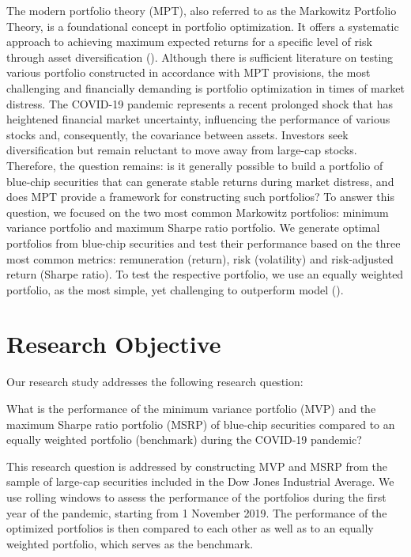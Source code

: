 \documentclass[a4paper,12pt]{article}
\begin{document}
The modern portfolio theory (MPT), also referred to as the Markowitz Portfolio Theory, is a foundational concept in portfolio optimization. It offers a systematic approach to achieving maximum expected returns for a specific level of risk through asset diversification (\cite{markowitz1952portfolio}). Although there is sufficient literature on testing various portfolio constructed in accordance with MPT provisions, the most challenging and financially demanding is portfolio optimization in times of market distress. 
The COVID-19 pandemic represents a recent prolonged shock that has heightened financial market uncertainty, influencing the performance of various stocks and, consequently, the covariance between assets. Investors seek diversification but remain reluctant to move away from large-cap stocks. Therefore, the question remains: is it generally possible to build a portfolio of blue-chip securities that can generate stable returns during market distress, and does MPT provide a framework for constructing such portfolios? To answer this question, we focused on the two most common Markowitz portfolios: minimum variance portfolio and maximum Sharpe ratio portfolio. We generate optimal portfolios from blue-chip securities and test their performance based on the three most common metrics: remuneration (return), risk (volatility) and risk-adjusted return (Sharpe ratio). To test the respective portfolio, we use an equally weighted portfolio, as the most simple, yet challenging to outperform model (\cite{demiguel2009generalized}).
\newpage 
\section{Research Objective \label{resobj}}
Our research study addresses the following research question:

What is the performance of the minimum variance portfolio (MVP) and the maximum Sharpe ratio portfolio (MSRP) of blue-chip securities compared to an equally weighted portfolio (benchmark) during the COVID-19 pandemic? 

This research question is addressed by constructing MVP and MSRP from the sample of large-cap securities included in the Dow Jones Industrial Average. We use rolling windows to assess the performance of the portfolios during the first year of the pandemic, starting from 1 November 2019. The performance of the optimized portfolios is then compared to each other as well as to an equally weighted portfolio, which serves as the benchmark. 
\newpage
\end{document}

